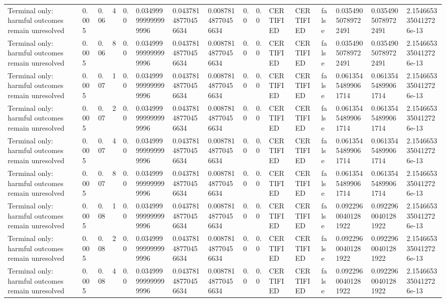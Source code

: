 \begin{tabular}{llllllllllllllll}
Terminal only: harmful outcomes remain unresolved & 0.005 & 0.06 & 4 & 0.0 & 0.034999999999999996 & 0.04378148770456634 & 0.00878148770456634 & 0.0 & 0.0 & CERTIFIED & CERTIFIED & false & 0.03549050789722491 & 0.03549050789722491 & 2.1546653350412726e-13 \\
Terminal only: harmful outcomes remain unresolved & 0.005 & 0.06 & 8 & 0.0 & 0.034999999999999996 & 0.04378148770456634 & 0.00878148770456634 & 0.0 & 0.0 & CERTIFIED & CERTIFIED & false & 0.03549050789722491 & 0.03549050789722491 & 2.1546653350412726e-13 \\
Terminal only: harmful outcomes remain unresolved & 0.005 & 0.07 & 1 & 0.0 & 0.034999999999999996 & 0.04378148770456634 & 0.00878148770456634 & 0.0 & 0.0 & CERTIFIED & CERTIFIED & false & 0.06135454899061714 & 0.06135454899061714 & 2.1546653350412726e-13 \\
Terminal only: harmful outcomes remain unresolved & 0.005 & 0.07 & 2 & 0.0 & 0.034999999999999996 & 0.04378148770456634 & 0.00878148770456634 & 0.0 & 0.0 & CERTIFIED & CERTIFIED & false & 0.06135454899061714 & 0.06135454899061714 & 2.1546653350412726e-13 \\
Terminal only: harmful outcomes remain unresolved & 0.005 & 0.07 & 4 & 0.0 & 0.034999999999999996 & 0.04378148770456634 & 0.00878148770456634 & 0.0 & 0.0 & CERTIFIED & CERTIFIED & false & 0.06135454899061714 & 0.06135454899061714 & 2.1546653350412726e-13 \\
Terminal only: harmful outcomes remain unresolved & 0.005 & 0.07 & 8 & 0.0 & 0.034999999999999996 & 0.04378148770456634 & 0.00878148770456634 & 0.0 & 0.0 & CERTIFIED & CERTIFIED & false & 0.06135454899061714 & 0.06135454899061714 & 2.1546653350412726e-13 \\
Terminal only: harmful outcomes remain unresolved & 0.005 & 0.08 & 1 & 0.0 & 0.034999999999999996 & 0.04378148770456634 & 0.00878148770456634 & 0.0 & 0.0 & CERTIFIED & CERTIFIED & false & 0.09229600401281922 & 0.09229600401281922 & 2.1546653350412726e-13 \\
Terminal only: harmful outcomes remain unresolved & 0.005 & 0.08 & 2 & 0.0 & 0.034999999999999996 & 0.04378148770456634 & 0.00878148770456634 & 0.0 & 0.0 & CERTIFIED & CERTIFIED & false & 0.09229600401281922 & 0.09229600401281922 & 2.1546653350412726e-13 \\
Terminal only: harmful outcomes remain unresolved & 0.005 & 0.08 & 4 & 0.0 & 0.034999999999999996 & 0.04378148770456634 & 0.00878148770456634 & 0.0 & 0.0 & CERTIFIED & CERTIFIED & false & 0.09229600401281922 & 0.09229600401281922 & 2.1546653350412726e-13 \\

\end{tabular}
